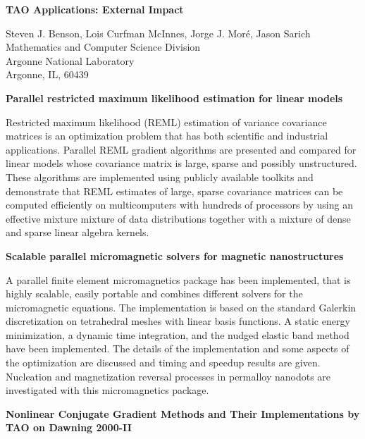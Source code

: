 \documentclass[11pt]{article}
\begin{document}
 
\pagestyle{empty}

{\center
{\bf \Large TAO Applications: External Impact}

{\large
Steven J. Benson, Lois Curfman McInnes, Jorge J. Mor\'e, Jason Sarich\\
Mathematics and Computer Science Division \\
Argonne National Laboratory \\
Argonne, IL, 60439\\
}
}

\vspace{0.5in}

\nocite{*}

\noindent
\textbf{Parallel restricted maximum likelihood estimation for linear 
    models}    
\cite{malard02parallel}

\noindent
Restricted maximum likelihood (REML) estimation of variance
covariance matrices is an optimization problem that has both
scientific and industrial applications. Parallel REML
gradient algorithms are presented and compared for linear
models whose covariance matrix is large, sparse and possibly
unstructured. These algorithms are implemented using
publicly available toolkits and demonstrate that REML
estimates of large, sparse covariance matrices can be
computed efficiently on multicomputers with hundreds of
processors by using an effective mixture mixture of data
distributions together with a mixture of dense and sparse
linear algebra kernels.


\bigskip
\noindent
\textbf{Scalable parallel micromagnetic solvers for magnetic
             nanostructures} 
\cite{scholz03scalable}

\noindent
 A parallel finite element micromagnetics package
has been implemented, that is highly scalable, easily
portable and combines different solvers for the micromagnetic
equations. The implementation is based on the standard
Galerkin discretization on tetrahedral meshes with linear
basis functions. A static energy minimization, a dynamic
time integration, and the nudged elastic band method have
been implemented. The details of the implementation and some
aspects of the optimization are discussed and timing and
speedup results are given. Nucleation and magnetization
reversal processes in permalloy nanodots are investigated
with this micromagnetics package.

\bigskip
\noindent
\textbf{Nonlinear Conjugate Gradient Methods and Their Implementations
  by TAO on Dawning 2000-II} 
\cite{wiang03cgmethods}
\end{document}
